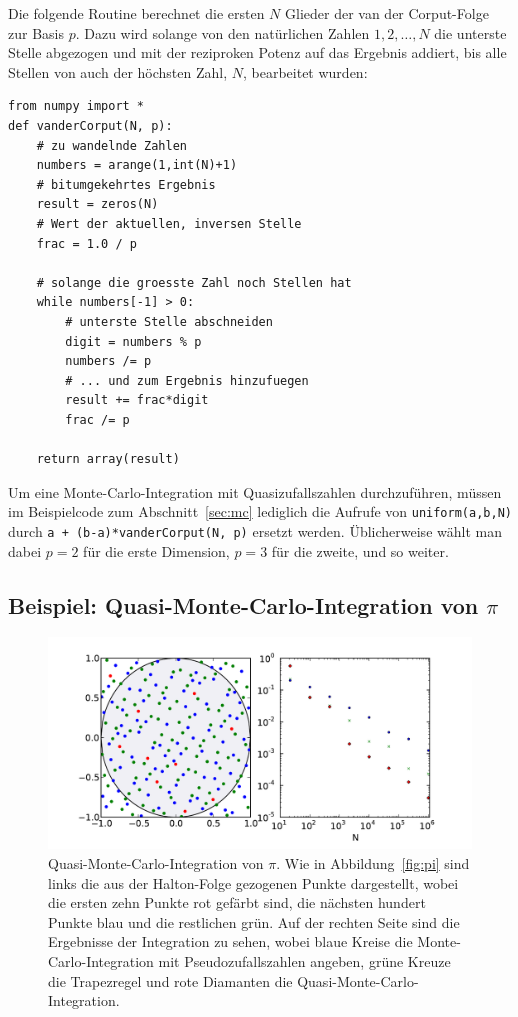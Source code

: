 Die folgende Routine berechnet die ersten $N$ Glieder der van der
Corput-Folge zur Basis $p$. Dazu wird solange von den natürlichen
Zahlen $1,2,\ldots,N$ die unterste Stelle abgezogen und mit der
reziproken Potenz auf das Ergebnis addiert, bis alle Stellen von auch
der höchsten Zahl, $N$, bearbeitet wurden:
\begin{lstlisting}
from numpy import *
def vanderCorput(N, p):
    # zu wandelnde Zahlen
    numbers = arange(1,int(N)+1)
    # bitumgekehrtes Ergebnis
    result = zeros(N)
    # Wert der aktuellen, inversen Stelle
    frac = 1.0 / p

    # solange die groesste Zahl noch Stellen hat
    while numbers[-1] > 0:
        # unterste Stelle abschneiden
        digit = numbers % p
        numbers /= p
        # ... und zum Ergebnis hinzufuegen
        result += frac*digit
        frac /= p

    return array(result)
\end{lstlisting}
Um eine Monte-Carlo-Integration mit Quasizufallszahlen durchzuführen,
müssen im Beispielcode zum Abschnitt~\ref{sec:mc} lediglich die
Aufrufe von \lstinline!uniform(a,b,N)! durch
\lstinline!a + (b-a)*vanderCorput(N, p)! ersetzt werden. Üblicherweise
wählt man dabei $p=2$ für die erste Dimension, $p=3$ für die zweite,
und so weiter.

\subsection{\texorpdfstring{Beispiel: Quasi-Monte-Carlo-Integration von $\pi$}{Beispiel: Quasi-Monte-Carlo-Integration von pi}}

\begin{figure}
  \centering
  \includegraphics[width=\textwidth]{plots/quasirandom}
  \caption{Quasi-Monte-Carlo-Integration von $\pi$. Wie in
    Abbildung~\ref{fig:pi} sind links die aus der Halton-Folge
    gezogenen Punkte dargestellt, wobei die ersten zehn Punkte rot
    gefärbt sind, die nächsten hundert Punkte blau und die restlichen
    grün. Auf der rechten Seite sind die Ergebnisse der Integration zu
    sehen, wobei blaue Kreise die Monte-Carlo-Integration mit
    Pseudozufallszahlen angeben, grüne Kreuze die Trapezregel und rote
    Diamanten die Quasi-Monte-Carlo-Integration.}
  \label{fig:qmc}
\end{figure}

